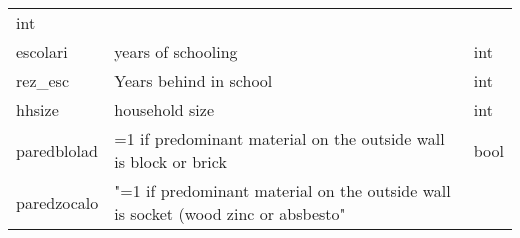 \documentclass[11pt]{article}
\begin{document}
\begin{longtable}[]{@{}lll@{}}
\begin{minipage}[t]{0.24\columnwidth}
int\strut
\end{minipage}\tabularnewline
\begin{minipage}[t]{0.19\columnwidth}\raggedright\strut
escolari\strut
\end{minipage} & \begin{minipage}[t]{0.16\columnwidth}\raggedright\strut
years of schooling\strut
\end{minipage} & \begin{minipage}[t]{0.24\columnwidth}\raggedright\strut
int\strut
\end{minipage}\tabularnewline
\begin{minipage}[t]{0.19\columnwidth}\raggedright\strut
rez\_esc\strut
\end{minipage} & \begin{minipage}[t]{0.16\columnwidth}\raggedright\strut
Years behind in school\strut
\end{minipage} & \begin{minipage}[t]{0.24\columnwidth}\raggedright\strut
int\strut
\end{minipage}\tabularnewline
\begin{minipage}[t]{0.19\columnwidth}\raggedright\strut
hhsize\strut
\end{minipage} & \begin{minipage}[t]{0.16\columnwidth}\raggedright\strut
household size\strut
\end{minipage} & \begin{minipage}[t]{0.24\columnwidth}\raggedright\strut
int\strut
\end{minipage}\tabularnewline
\begin{minipage}[t]{0.19\columnwidth}\raggedright\strut
paredblolad\strut
\end{minipage} & \begin{minipage}[t]{0.16\columnwidth}\raggedright\strut
=1 if predominant material on the outside wall is block or brick\strut
\end{minipage} & \begin{minipage}[t]{0.24\columnwidth}\raggedright\strut
bool\strut
\end{minipage}\tabularnewline
\begin{minipage}[t]{0.19\columnwidth}\raggedright\strut
paredzocalo\strut
\end{minipage} & \begin{minipage}[t]{0.16\columnwidth}\raggedright\strut
"=1 if predominant material on the outside wall is socket (wood zinc or
absbesto"\strut
\end{minipage} & \begin{minipage}[t]{0.24\columnwidth}\raggedright\strut

\end{minipage}
\end{longtable}
\end{document}

